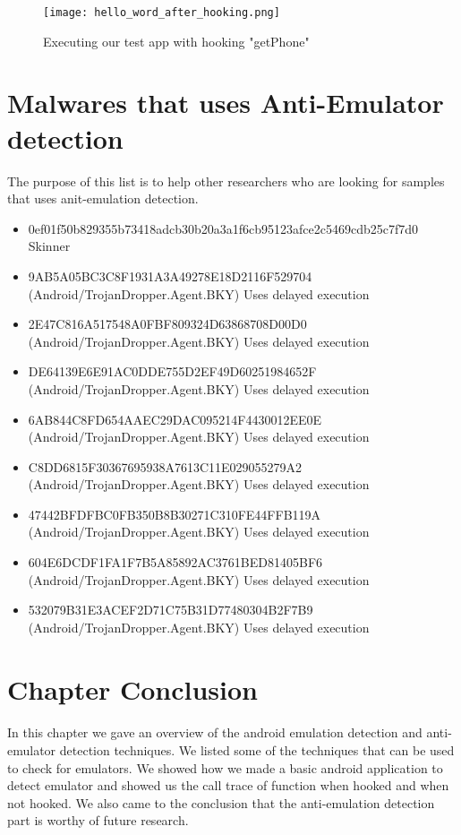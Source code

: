 \documentclass[../main.tex]{subfile}
\begin{document}
		\begin{figure}
			\texttt{[image: hello\_word\_after\_hooking.png]}
			\caption{Executing our test app with hooking  "getPhone"}
			\label{fig:hooking_execute}			
		\end{figure}	
	
	
	\section{Malwares that uses Anti-Emulator detection}
	The purpose of this list is to help other researchers who are looking for samples that uses anit-emulation detection.
	\begin{itemize}
		\item 0ef01f50b829355b73418adcb30b20a3a1f6cb95123afce2c5469cdb25c7f7d0 Skinner
		\item 9AB5A05BC3C8F1931A3A49278E18D2116F529704 (Android/TrojanDropper.Agent.BKY) Uses delayed execution \cite{eset_multi_stage_malware}
		\item 2E47C816A517548A0FBF809324D63868708D00D0 (Android/TrojanDropper.Agent.BKY) Uses delayed execution \cite{eset_multi_stage_malware}
		\item DE64139E6E91AC0DDE755D2EF49D60251984652F (Android/TrojanDropper.Agent.BKY) Uses delayed execution \cite{eset_multi_stage_malware}
		\item 6AB844C8FD654AAEC29DAC095214F4430012EE0E (Android/TrojanDropper.Agent.BKY) Uses delayed execution \cite{eset_multi_stage_malware}
		\item C8DD6815F30367695938A7613C11E029055279A2 (Android/TrojanDropper.Agent.BKY) Uses delayed execution \cite{eset_multi_stage_malware}
		\item 47442BFDFBC0FB350B8B30271C310FE44FFB119A (Android/TrojanDropper.Agent.BKY) Uses delayed execution \cite{eset_multi_stage_malware}
		\item 604E6DCDF1FA1F7B5A85892AC3761BED81405BF6 (Android/TrojanDropper.Agent.BKY) Uses delayed execution \cite{eset_multi_stage_malware}
		\item 532079B31E3ACEF2D71C75B31D77480304B2F7B9 (Android/TrojanDropper.Agent.BKY) Uses delayed execution \cite{eset_multi_stage_malware}
	\end{itemize}
	\section{Chapter Conclusion}
	\paragraph{} In this chapter we gave an overview of the android emulation detection and anti-emulator detection techniques. We listed some of the techniques that can be used to check for emulators. We showed how we made a basic android application to detect emulator and showed us the call trace of function when hooked and when not hooked. We also came to the conclusion that the anti-emulation detection part is worthy of future research.
			
\end{document}
